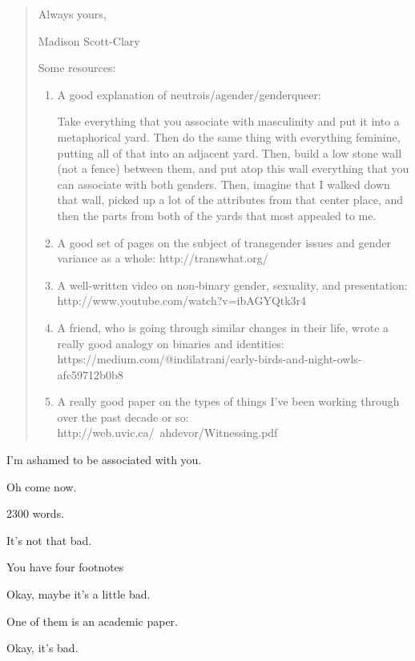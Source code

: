 \begin{paracol}{2}
\begin{leftcolumn}
\begin{quotation}
Always yours,

Madison Scott-Clary

Some resources:

\begin{enumerate}
  \item A good explanation of neutrois/agender/genderqueer:

    Take everything that you associate with masculinity and put it into a metaphorical yard. Then do the same thing with everything feminine, putting all of that into an adjacent yard. Then, build a low stone wall (not a fence) between them, and put atop this wall everything that you can associate with both genders. Then, imagine that I walked down that wall, picked up a lot of the attributes from that center place, and then the parts from both of the yards that most appealed to me.

  \item A good set of pages on the subject of transgender issues and gender variance as a whole: http://transwhat.org/

  \item A well-written video on non-binary gender, sexuality, and presentation: http://www.youtube.com/watch?v=ibAGYQtk3r4

  \item A friend, who is going through similar changes in their life, wrote a really good analogy on binaries and identities: https://medium.com/@indilatrani/early-birds-and-night-owls-afc59712b0b8

  \item A really good paper on the types of things I've been working through over the past decade or so: http://web.uvic.ca/~ahdevor/Witnessing.pdf
\end{enumerate}
\end{quotation}

\begin{ally}
I'm ashamed to be associated with you.
\end{ally}
Oh come now.

\begin{ally}
2300 words.
\end{ally}
It's not that bad.

\begin{ally}
You have four footnotes
\end{ally}
Okay, maybe it's a little bad.

\begin{ally}
One of them is an academic paper.
\end{ally}
Okay, it's bad.


\end{leftcolumn}
\end{paracol}
